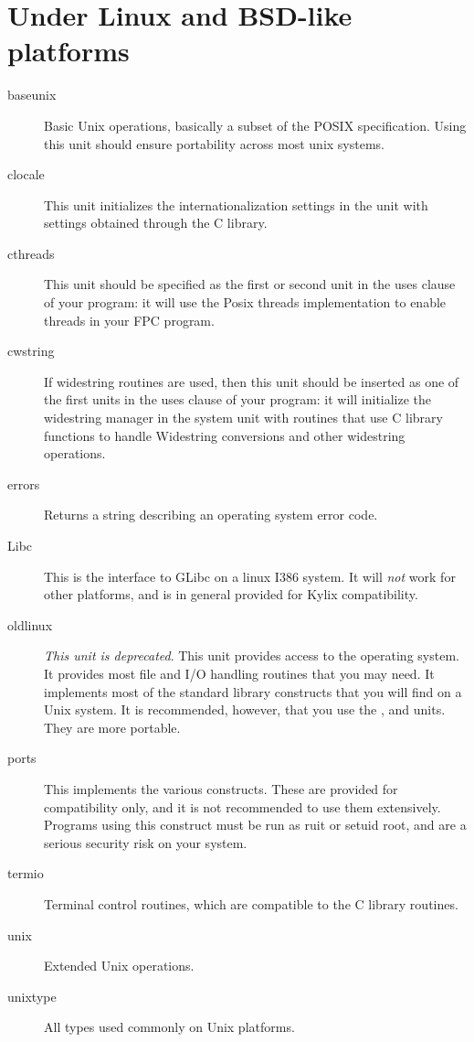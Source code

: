 \section{Under Linux and BSD-like platforms}
\begin{description}
\item[baseunix] Basic Unix operations, basically a subset of the POSIX specification. 
Using this unit should ensure portability across most unix systems.
\item[clocale] This unit initializes the internationalization settings in
the  unit with settings obtained through the C library.
\item[cthreads] This unit should be specified as the first or second
unit in the uses clause of your program: it will use the Posix threads
implementation to enable threads in your FPC program.
\item[cwstring] If widestring routines are used, then this unit should 
be inserted as one of the first units in the uses clause of your program:
it will initialize the widestring manager in the system unit with routines
that use C library functions to handle Widestring conversions and other
widestring operations.
\item[errors] Returns a string describing an operating system error code.
\item[Libc] This is the interface to GLibc on a linux I386 system. It will
{\em not} work for other platforms, and is in general provided for Kylix
compatibility. 
\item[oldlinux] \emph{This unit is deprecated}. This unit provides access to the
\linux operating system. It provides most file and I/O handling routines
that you may need. It implements most of the standard  library constructs
that you will find on a Unix system. It is recommended, however, that you
use the ,  and  units. They are
more portable.
\item[ports] This implements the various  constructs. These are
provided for compatibility only, and it is not recommended to use them
extensively. Programs using this construct must be run as ruit or setuid
root, and are a serious security risk on your system.
\item[termio] Terminal control routines, which are compatible to the C
library routines.
\item[unix] Extended Unix operations.
\item[unixtype] All types used commonly on Unix platforms.
\end{description}

